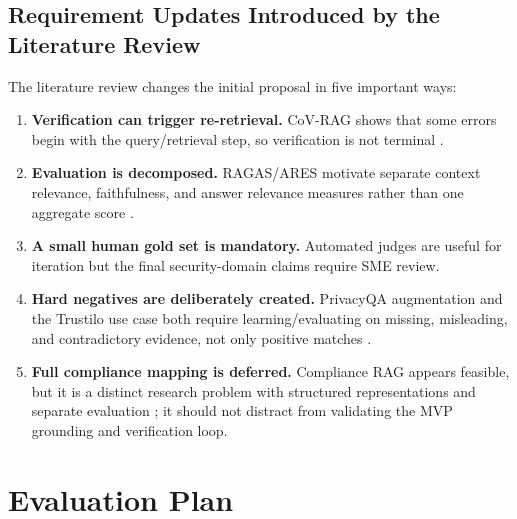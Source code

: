 \documentclass[11pt,journal,onecolumn]{IEEEtran}
\begin{document}
\subsection{Requirement Updates Introduced by the Literature Review}
The literature review changes the initial proposal in five important ways:
\begin{enumerate}[leftmargin=1.7em]
    \item \textbf{Verification can trigger re-retrieval.} CoV-RAG shows that some errors begin with the query/retrieval step, so verification is not terminal \cite{he2024covrag}.
    \item \textbf{Evaluation is decomposed.} RAGAS/ARES motivate separate context relevance, faithfulness, and answer relevance measures rather than one aggregate score \cite{es2024ragas,saadfalcon2024ares}.
    \item \textbf{A small human gold set is mandatory.} Automated judges are useful for iteration but the final security-domain claims require SME review.
    \item \textbf{Hard negatives are deliberately created.} PrivacyQA augmentation and the Trustilo use case both require learning/evaluating on missing, misleading, and contradictory evidence, not only positive matches \cite{parvez2023privacyqa}.
    \item \textbf{Full compliance mapping is deferred.} Compliance RAG appears feasible, but it is a distinct research problem with structured representations and separate evaluation \cite{sun2025compliance}; it should not distract from validating the MVP grounding and verification loop.
\end{enumerate}

\section{Evaluation Plan}
\end{document}
